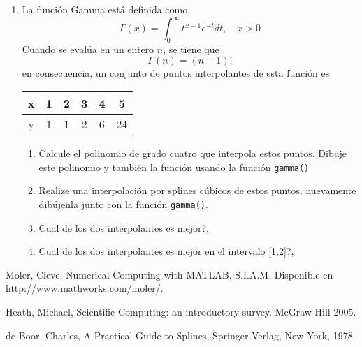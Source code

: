 \documentclass[12pt,letterpaper]{article}
\begin{document}
\begin{enumerate}
\item La funci\'on Gamma est\'a definida como
$$
\Gamma(x)=\int_0^\infty t^{x-1}e^{-t}dt, \quad x>0
$$
Cuando se eval\'ua en un entero $n$, se tiene que 
$$
\Gamma(n)=(n-1)!
$$
en consecuencia, un conjunto de puntos interpolantes de esta funci\'on es 
\begin{center}
\begin{tabular}{c|ccccc}
x 	& 1 & 2	& 3 & 4 & 5 \\
\hline
y	& 1	& 1 & 2 & 6 & 24
\end{tabular}
\end{center}
\begin{enumerate}
\item Calcule el polinomio de grado cuatro que interpola estos puntos. Dibuje este polinomio y tambi\' en la funci\'on usando la funci\'on \texttt{gamma()}
\item Realize una interpolaci\'on por splines c\'ubicos de estos puntos, nuevamente dib\'ujenla junto con la funci\'on \texttt{gamma()}.
\item \textquestiondown Cual de los dos interpolantes es mejor?,
\item \textquestiondown Cual de los dos interpolantes es mejor en el intervalo [1,2]?,
\end{enumerate}



\end{enumerate}

\begin{thebibliography}{9}


 Moler, Cleve, Numerical Computing with MATLAB, S.I.A.M. Disponible en http://www.mathworks.com/moler/.

 Heath, Michael, Scientific Computing: an introductory survey. McGraw Hill 2005.

 de Boor, Charles, A Practical Guide to Splines, Springer-Verlag, New York, 1978.


\end{thebibliography}
\end{document}
